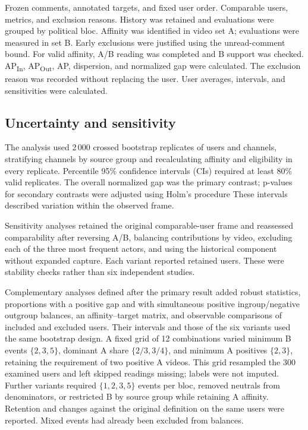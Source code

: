 \documentclass[conference, letterpaper]{IEEEtran}
\begin{document}
\begin{algorithm}[t]
\caption{Individual polarization and dispersion measurement}
\label{alg:polarization}
\begin{algorithmic}[1]
\Require Frozen comments, annotated targets, and fixed user order.
\Ensure Comparable users, metrics, and exclusion reasons.
\State History was retained and evaluations were grouped by political bloc.
\State Affinity was identified in video set A; evaluations were measured in set B.
\State Early exclusions were justified using the unread-comment bound.
\State For valid affinity, A/B reading was completed and B support was checked.
\State AP\textsubscript{In}, AP\textsubscript{Out}, AP, dispersion, and normalized gap were calculated.
\Else
\State The exclusion reason was recorded without replacing the user.
\EndIf
\EndFor
\State User averages, intervals, and sensitivities were calculated.
\end{algorithmic}
\end{algorithm}

\subsection{Uncertainty and sensitivity}
The analysis used 2\,000 crossed bootstrap replicates of users and channels, stratifying channels by source group and recalculating affinity and eligibility in every replicate. Percentile 95\% confidence intervals (CIs) required at least 80\% valid replicates. The overall normalized gap was the primary contrast; p-values for secondary contrasts were adjusted using Holm's procedure \cite{Holm1979} These intervals described variation within the observed frame.

Sensitivity analyses retained the original comparable-user frame and reassessed comparability after reversing A/B, balancing contributions by video, excluding each of the three most frequent actors, and using the historical component without expanded capture. Each variant reported retained users. These were stability checks rather than six independent studies.

Complementary analyses defined after the primary result added robust statistics, proportions with a positive gap and with simultaneous positive ingroup/negative outgroup balances, an affinity--target matrix, and observable comparisons of included and excluded users. Their intervals and those of the six variants used the same bootstrap design. A fixed grid of 12 combinations varied minimum B events $\{2,3,5\}$, dominant A share $\{2/3,3/4\}$, and minimum A positives $\{2,3\}$, retaining the requirement of two positive A videos. This grid resampled the 300 examined users and left skipped readings missing; labels were not imputed. Further variants required $\{1,2,3,5\}$ events per bloc, removed neutrals from denominators, or restricted B by source group while retaining A affinity. Retention and changes against the original definition on the same users were reported. Mixed events had already been excluded from balances.
\end{document}
